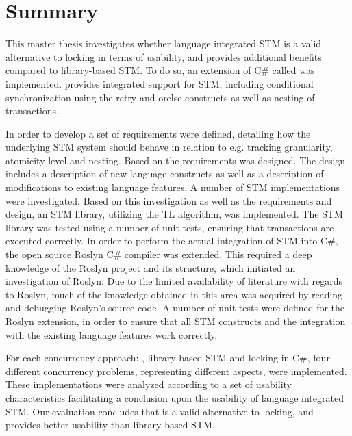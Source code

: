 \chapter[]{Summary}

This master thesis investigates whether language integrated STM is a valid alternative to locking in terms of usability, and provides additional benefits compared to library-based STM. To do so, an extension of C\# called \stmname was implemented. \stmname provides integrated support for STM, including conditional synchronization using the retry and orelse constructs as well as nesting of transactions. 

In order to develop \stmname a set of requirements were defined, detailing how the underlying \ac{STM} system should behave in relation to e.g. tracking granularity, atomicity level and nesting. Based on the requirements \stmname was designed. The design includes a description of new language constructs as well as a description of modifications to existing language features. A number of \ac{STM} implementations were investigated. Based on this investigation as well as the requirements and design, an \ac{STM} library, utilizing the TL algorithm, was implemented. The \ac{STM} library was tested using a number of unit tests, ensuring that transactions are executed correctly. In order to perform the actual integration of \ac{STM} into C\#, the open source Roslyn C\# compiler was extended. This required a deep knowledge of the Roslyn project and its structure, which initiated an investigation of Roslyn. Due to the limited availability of literature with regards to Roslyn, much of the knowledge obtained in this area was acquired by reading and debugging Roslyn's source code. A number of unit tests were defined for the Roslyn extension, in order to ensure that all \ac{STM} constructs and the integration with the existing language features work correctly. 

For each concurrency approach: \stmname, library-based STM and locking in C\#, four different concurrency problems, representing different aspects, were implemented. These implementations were analyzed according to a set of usability characteristics facilitating a conclusion upon the usability of language integrated STM. Our evaluation concludes that \stmname is a valid alternative to locking, and provides better usability than library based STM. 